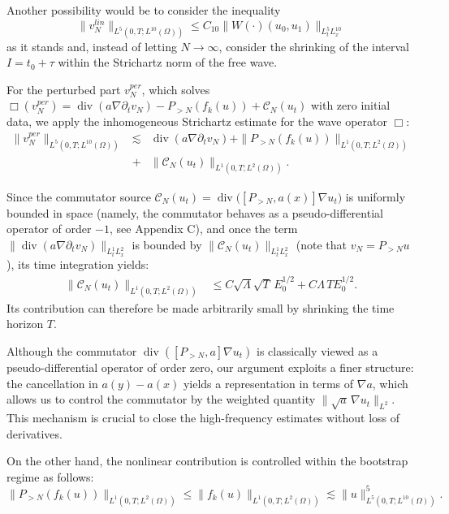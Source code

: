 \documentclass[11pt,letterpaper]{amsart}
\newcommand{\dive}{\operatorname{div}}
\begin{document}
Another possibility would be to consider the inequality
\begin{equation}\label{eq:free_wave}
    \|v_N^{lin}\|_{L^5(0,T; L^{10}(\Omega))} \le C_{10}\|W(\cdot)(u_0,u_1)\|_{L^5_tL^{10}_x}
\end{equation}
as it stands and, instead of letting $N \to \infty$, consider the shrinking of the interval $I = t_0 + \tau$ within the Strichartz norm of the free wave.

For the perturbed part $v_N^{per}$, which solves $\Box(v_N^{per}) = \dive(a\nabla\partial_tv_N) - P_{>N}(f_k(u)) + \mathcal{C}_N(u_t)$ with zero initial data, we apply the inhomogeneous Strichartz estimate for the wave operator $\Box$:
\begin{eqnarray}
    \|v_N^{per}\|_{L^5(0,T;L^{10}(\Omega))} &\lesssim& \dive(a\nabla\partial_tv_N) + \|P_{>N}(f_k(u))\|_{L^1(0,T;L^2(\Omega))}\\ 
   &+& \|\mathcal{C}_N(u_t)\|_{L^1(0,T;L^2(\Omega))}.\nonumber
\end{eqnarray}

Since the commutator source $\mathcal{C}_N(u_t)=\operatorname{div}\Big( [P_{>N}, a(x)] \nabla u_t \Big)$ is uniformly bounded in space (namely, the commutator behaves as a pseudo-differential operator of order $-1$, see Appendix C), and once the term $\|\dive(a\nabla\partial_tv_N)\|_{L^1_t L^2_x}$ is bounded by $\|\mathcal{C}_N(u_t)\|_{L^1_tL^2_x}$ (note that $v_N= P_{>N}u$), its time integration yields:
\begin{align}\label{time_commutator_bound}
    \|\mathcal{C}_N(u_t)\|_{L^1(0,T;L^2(\Omega))} &\le C\sqrt{\Lambda} \sqrt{T}\,E_0^{1/2} + C\Lambda\,T E_0^{1/2}.
\end{align}
Its contribution can therefore be made arbitrarily small by shrinking the time horizon $T$.

Although the commutator $\operatorname{div}([P_{>N},a]\nabla u_t)$ is
classically viewed as a pseudo-differential operator of order zero,
our argument exploits a finer structure: the cancellation in
$a(y)-a(x)$ yields a representation in terms of $\nabla a$, which
allows us to control the commutator by the weighted quantity
$\|\sqrt{a}\,\nabla u_t\|_{L^2}$. This mechanism is crucial to close
the high-frequency estimates without loss of derivatives.

On the other hand, the nonlinear contribution is controlled within the bootstrap regime as follows:
\begin{equation}
    \|P_{>N}(f_k(u))\|_{L^1(0,T;L^2(\Omega))} \le \|f_k(u)\|_{L^1(0,T;L^2(\Omega))} \lesssim \|u\|_{L^5(0,T;L^{10}(\Omega))}^5.
\end{equation}
\end{document}
